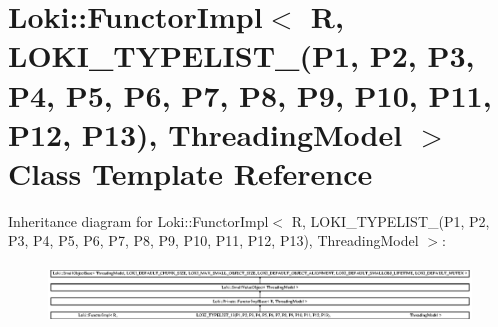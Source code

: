 \hypertarget{classLoki_1_1FunctorImpl_3_01R_00_01_01_01_01_01_01_01_01_01_01_01_01_01_01_01_01_01_01_01_01_01a61bd4e4c12f56d6be0c2d19e011aa2f}{}\section{Loki\+:\+:Functor\+Impl$<$ R, L\+O\+K\+I\+\_\+\+T\+Y\+P\+E\+L\+I\+S\+T\+\_(P1, P2, P3, P4, P5, P6, P7, P8, P9, P10, P11, P12, P13), Threading\+Model $>$ Class Template Reference}
\label{classLoki_1_1FunctorImpl_3_01R_00_01_01_01_01_01_01_01_01_01_01_01_01_01_01_01_01_01_01_01_01_01a61bd4e4c12f56d6be0c2d19e011aa2f}
Inheritance diagram for Loki\+:\+:Functor\+Impl$<$ R, L\+O\+K\+I\+\_\+\+T\+Y\+P\+E\+L\+I\+S\+T\+\_(P1, P2, P3, P4, P5, P6, P7, P8, P9, P10, P11, P12, P13), Threading\+Model $>$\+:\begin{figure}[H]
\begin{center}
\leavevmode
\includegraphics[height=1.545894cm]{classLoki_1_1FunctorImpl_3_01R_00_01_01_01_01_01_01_01_01_01_01_01_01_01_01_01_01_01_01_01_01_01a61bd4e4c12f56d6be0c2d19e011aa2f}
\end{center}
\end{figure}
